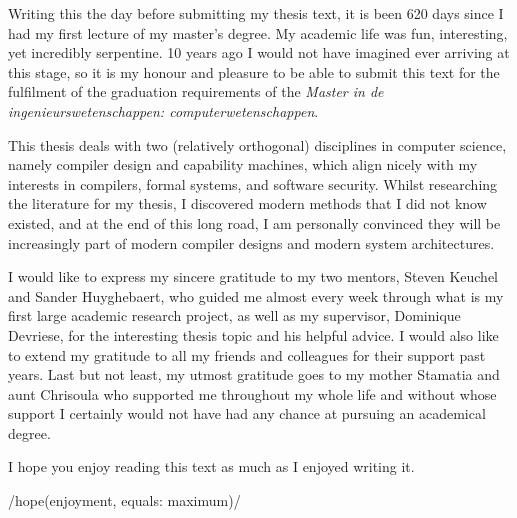 \documentclass[master=cws, oneside, english, extralanguage=dutch]{kulemt}	%
\newcommand{\onlyinsubfile}[1]{#1}
\newcommand{\notinsubfile}[1]{}
\newcommand{\biblio}{}
\begin{document}
\renewcommand{\onlyinsubfile}[1]{}
\renewcommand{\notinsubfile}[1]{#1}
\def\biblio{}

\begin{preface}
	Writing this the day before submitting my thesis text, it is been 620 days since I had my first lecture of my master's degree. My academic life was fun, interesting, yet incredibly serpentine. 10 years ago I would not have imagined ever arriving at this stage, so it is my honour and pleasure to be able to submit this text for the fulfilment of the graduation requirements of the \emph{Master in de ingenieurswetenschappen: computerwetenschappen}.
	
	This thesis deals with two (relatively orthogonal) disciplines in computer science, namely compiler design and capability machines, which align nicely with my interests in compilers, formal systems, and software security. Whilst researching the literature for my thesis, I discovered modern methods that I did not know existed, and at the end of this long road, I am personally convinced they will be increasingly part of modern compiler designs and modern system architectures.
	
	I would like to express my sincere gratitude to my two mentors, Steven Keuchel and Sander Huyghebaert, who guided me almost every week through what is my first large academic research project, as well as my supervisor, Dominique Devriese, for the interesting thesis topic and his helpful advice. I would also like to extend my gratitude to all my friends and colleagues for their support past years. Last but not least, my utmost gratitude goes to my mother Stamatia and aunt Chrisoula who supported me throughout my whole life and without whose support I certainly would not have had any chance at pursuing an academical degree.
	
	I hope you enjoy reading this text as much as I enjoyed writing it.
	
	\iil/hope(enjoyment, equals: maximum)/
\end{preface}

\tableofcontents*




\mainmatter








\appendix



\backmatter
\glsaddall
{}
\printglossaries


\end{document}
